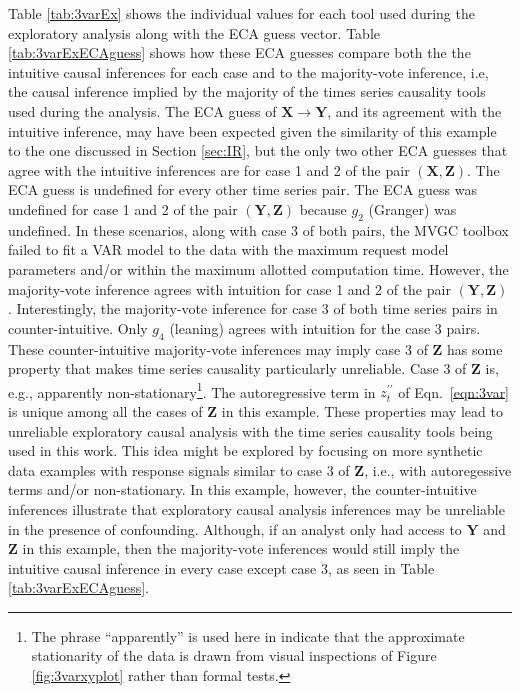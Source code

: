 Table \ref{tab:3varEx} shows the individual values for each tool used during the exploratory analysis along with the ECA guess vector.  Table \ref{tab:3varExECAguess} shows how these ECA guesses compare both the the intuitive causal inferences for each case and to the majority-vote inference, i.e, the causal inference implied by the majority of the times series causality tools used during the analysis.  The ECA guess of $\mathbf{X}\rightarrow\mathbf{Y}$, and its agreement with the intuitive inference, may have been expected given the similarity of this example to the one discussed in Section \ref{sec:IR}, but the only two other ECA guesses that agree with the intuitive inferences are for case 1 and 2 of the pair $(\mathbf{X},\mathbf{Z})$.  The ECA guess is undefined for every other time series pair.  The ECA guess was undefined for case 1 and 2 of the pair $(\mathbf{Y},\mathbf{Z})$ because $g_2$ (Granger) was undefined.  In these scenarios, along with case 3 of both pairs, the MVGC toolbox failed to fit a VAR model to the data with the maximum request model parameters and/or within the maximum allotted computation time.  However, the majority-vote inference agrees with intuition for case 1 and 2 of the pair $(\mathbf{Y},\mathbf{Z})$.  Interestingly, the majority-vote inference for case 3 of both time series pairs in counter-intuitive.  Only $g_4$ (leaning) agrees with intuition for the case 3 pairs.  These counter-intuitive majority-vote inferences may imply case 3 of $\mathbf{Z}$ has some property that makes time series causality particularly unreliable.  Case 3 of $\mathbf{Z}$ is, e.g., apparently non-stationary\footnote{The phrase ``apparently'' is used here in indicate that the approximate stationarity of the data is drawn from visual inspections of Figure \ref{fig:3varxyplot} rather than formal tests.}.  The autoregressive term in $z_t^{\prime\prime}$ of Eqn.\ \ref{eqn:3var} is unique among all the cases of $\mathbf{Z}$ in this example.  These properties may lead to unreliable exploratory causal analysis with the time series causality tools being used in this work.  This idea might be explored by focusing on more synthetic data examples with response signals similar to case 3 of $\mathbf{Z}$, i.e., with autoregessive terms and/or non-stationary.  In this example, however, the counter-intuitive inferences illustrate that exploratory causal analysis inferences may be unreliable in the presence of confounding.  Although, if an analyst only had access to $\mathbf{Y}$ and $\mathbf{Z}$ in this example, then the majority-vote inferences would still imply the intuitive causal inference in every case except case 3, as seen in Table \ref{tab:3varExECAguess}.

